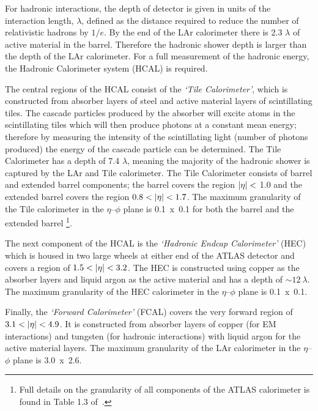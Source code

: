 For hadronic interactions, the depth of detector is given in units of the interaction length, $\lambda$,
defined as the distance required to reduce the number of relativistic hadrons by $1/e$.
By the end of the LAr calorimeter there is 2.3 $\lambda$ of active material in the barrel.
Therefore the hadronic shower depth is larger than the depth of the LAr calorimeter.
For a full measurement of the hadronic energy, the Hadronic Calorimeter system (HCAL) is required. 

The central regions of the HCAL consist of the \textit{`Tile Calorimeter'},
which is constructed from absorber layers of steel and active material layers of scintillating tiles.
The cascade particles produced by the absorber will excite atoms in the scintillating tiles which will then produce photons at a constant mean energy;
therefore by measuring the intensity of the scintillating light (number of photons produced) the energy of the cascade particle can be determined.
The Tile Calorimeter has a depth of 7.4 $\lambda$, meaning the majority of the hadronic shower is captured by the LAr and Tile calorimeter.
The Tile Calorimeter consists of barrel and extended barrel components;
the barrel covers the region $|\eta|\nobreak<$ 1.0 and the extended barrel covers the region $0.8\nobreak<\nobreak|\eta|\nobreak<\nobreak1.7$.
The maximum granularity of the Tile calorimeter in the $\eta$--$\phi$ plane
is 0.1~x~0.1 for both the barrel and the extended barrel \footnote{Full details on the granularity of all components of the ATLAS calorimeter is found in Table 1.3 of~\cite{det-ATLAS_Exp}.}. 

The next component of the HCAL is the \textit{`Hadronic Endcap Calorimeter'} (HEC)
which is housed in two large wheels at either end of the ATLAS detector
and covers a region of $1.5\nobreak<\nobreak|\eta|\nobreak<\nobreak3.2$.
The HEC is constructed using copper as the absorber layers and liquid argon as the active material
and has a depth of $\sim 12~\lambda$.
The maximum granularity of the HEC calorimeter in the $\eta$--$\phi$ plane is \mbox{0.1~x~0.1.}

Finally, the \textit{`Forward Calorimeter'} (FCAL) covers the very forward region of $3.1\nobreak<\nobreak|\eta|\nobreak<\nobreak4.9$.
It is constructed from absorber layers of
copper (for EM interactions) and tungsten (for hadronic interactions)
with liquid argon for the active material layers.
The maximum granularity of the LAr calorimeter in the $\eta$--$\phi$ plane is 3.0~x~2.6.

